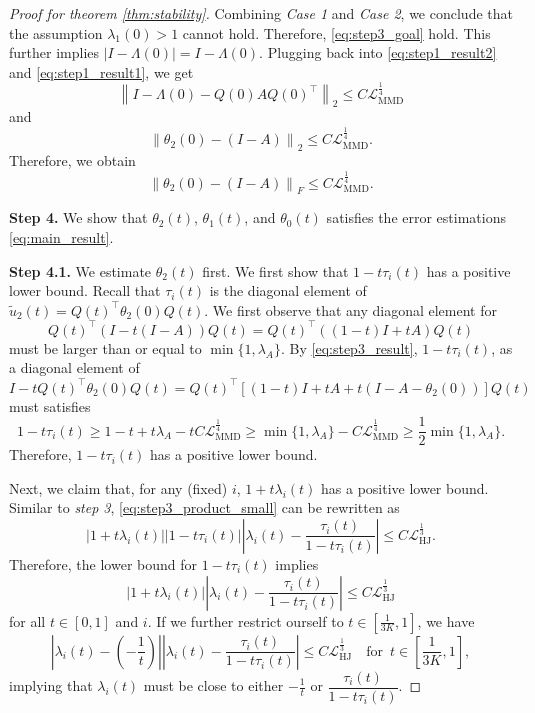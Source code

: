 \documentclass{article} %
\theoremstyle{plain}
\theoremstyle{definition}
\theoremstyle{remark}
\newcommand{\norm}[2][H^s]{\left\|#2\right\|_{#1}}
\newcommand{\LMMD}{\mathcal{L}_{\text{MMD}}}
\newcommand{\LHJ}{\mathcal{L}_{\text{HJ}}}
\newcommand{\lam}{\lambda}
\newcommand{\Lam}{\Lambda}
\newcommand{\wt}{\widetilde}
\newcommand{\tp}{^{\top}}
\newcommand{\parentheses}[1]{\left(#1\right)}
\newcommand{\sqbra}[1]{\left[#1\right]}
\newcommand{\abs}[1]{\left|#1\right|}
\begin{document}
\begin{proof}[Proof for theorem \ref{thm:stability}]
Combining \emph{Case 1} and \emph{Case 2}, we conclude that the assumption $\lam_1(0) > 1$ cannot hold. Therefore, \eqref{eq:step3_goal} hold. This further implies $\abs{I-\Lambda(0)} = I-\Lambda(0)$. Plugging back into \eqref{eq:step1_result2} and \eqref{eq:step1_result1}, we get 
$$\norm[2]{I-\Lam(0) - Q(0)AQ(0)\tp} \le C \LMMD^{\frac14}$$
and
$$\norm[2]{\theta_2(0) - (I - A)} \le C \LMMD^{\frac14}.$$
Therefore, we obtain
\begin{equation}\label{eq:step3_result}
\norm[F]{\theta_2(0) - (I - A)} \le C \LMMD^{\frac14}.
\end{equation}


\medskip
\textbf{Step 4.} We show that $\theta_2(t)$, $\theta_1(t)$, and $\theta_0(t)$ satisfies the error estimations \eqref{eq:main_result}.

\textbf{Step 4.1.} We estimate $\theta_2(t)$ first.
We first show that $1-t\tau_i(t)$ has a positive lower bound. Recall that $\tau_i(t)$ is the diagonal element of $\wt{u}_2(t) = Q(t)\tp \theta_2(0) Q(t)$. We first observe that any diagonal element for
$$Q(t)\tp (I - t(I-A)) Q(t) = Q(t)\tp ((1-t)I + tA) Q(t)$$
must be larger than or equal to $\min\{1,\lam_A\}$. By \eqref{eq:step3_result}, $1-t \tau_i(t)$, as a diagonal element of
$$I - t Q(t)\tp \theta_2(0) Q(t) = Q(t)\tp \sqbra{ (1-t)I + tA + t\parentheses{I-A-\theta_2(0)}} Q(t)$$ must satisfies
$$1-t \tau_i(t) \ge 1-t+t\lam_A - tC \LMMD^{\frac14}  \ge \min\{1,\lam_A\} - C \LMMD^{\frac14} \ge \frac12 \min\{1,\lam_A\}.$$
Therefore, $1-t\tau_i(t)$ has a positive lower bound.

Next, we claim that, for any (fixed) $i$, $1+t \lam_i(t)$ has a positive lower bound. Similar to \emph{step 3}, \eqref{eq:step3_product_small} can be rewritten as
\begin{equation*}
\abs{1+t\lam_i(t)} \abs{1-t\tau_i(t)} \abs{\lam_i(t) - \dfrac{\tau_i(t)}{1-t\tau_i(t)}} \le C \LHJ^{\frac13}.
\end{equation*}
Therefore, the lower bound for $1-t\tau_i(t)$ implies
\begin{equation}\label{eq:step41_temp0}
\abs{1+t\lam_i(t)} \abs{\lam_i(t) - \dfrac{\tau_i(t)}{1-t\tau_i(t)}} \le C \LHJ^{\frac13}
\end{equation}
for all $t\in [0,1]$ and $i$. If we further restrict ourself to $t \in [\frac{1}{3K},1]$, we have 
\begin{equation}\label{eq:step41_temp3}
\abs{\lam_i(t) - (-\frac{1}{t})} \abs{\lam_i(t) - \dfrac{\tau_i(t)}{1-t\tau_i(t)}} \le C \LHJ^{\frac13} \quad \text{for } \, t \in [\frac{1}{3K},1],
\end{equation}
implying that $\lam_i(t)$ must be close to either $-\frac{1}{t}$ or $\dfrac{\tau_i(t)}{1 - t \tau_i(t)}$.


\end{proof}
\end{document}
